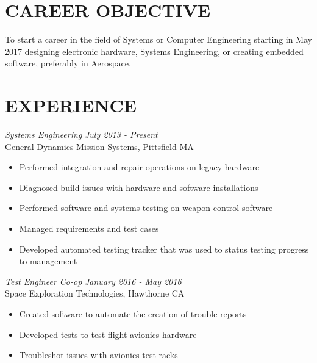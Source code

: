 \documentclass[line,margin]{res}
\begin{document}
\setlength\columnsep{-30pt}
\address{56 South St.}
\address{Drury MA, 01343}
\website{}
 
\begin{resume}
 \setlength\multicolsep{2pt}

\section{CAREER OBJECTIVE}   
	To start a career in the field of Systems or Computer Engineering starting in May 2017 designing electronic hardware, Systems Engineering, or creating embedded software, preferably in Aerospace.
 
\section{EXPERIENCE} 
{\sl Systems Engineering} \hfill {\sl July 2013 - Present }\\
	General Dynamics Mission Systems, Pittsfield MA
	\begin{itemize}  \itemsep -2pt %
		\item Performed integration and repair operations on legacy hardware
		\item Diagnosed build issues with hardware and software installations
		\item Performed software and systems testing on weapon control software
		\item Managed requirements and test cases
		\item Developed automated testing tracker that was used to status testing progress to management
	\end{itemize}
{\sl  Test Engineer Co-op} \hfill {\sl January 2016 - May 2016}\\
	Space Exploration Technologies, Hawthorne CA
	\begin{itemize}  \itemsep -2pt %
		\item Created software to automate the creation of trouble reports
		\item Developed tests to test flight avionics hardware
		\item Troubleshot issues with avionics test racks
	\end{itemize}
	\vspace{-5pt}
 

\end{resume}
\end{document}
